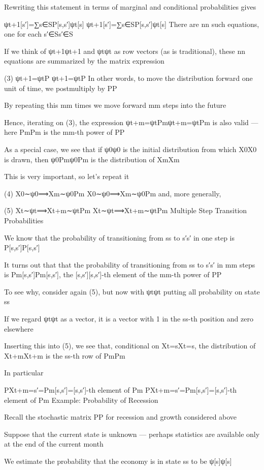 Rewriting this statement in terms of marginal and conditional probabilities gives

ψt+1[s′]=∑s∈SP[s,s′]ψt[s]
ψt+1[s′]=∑s∈SP[s,s′]ψt[s]
There are nn such equations, one for each s′∈Ss′∈S

If we think of ψt+1ψt+1 and ψtψt as row vectors (as is traditional), these nn equations are summarized by the matrix expression

(3)
ψt+1=ψtP
ψt+1=ψtP
In other words, to move the distribution forward one unit of time, we postmultiply by PP

By repeating this mm times we move forward mm steps into the future

Hence, iterating on (3), the expression ψt+m=ψtPmψt+m=ψtPm is also valid — here PmPm is the mm-th power of PP

As a special case, we see that if ψ0ψ0 is the initial distribution from which X0X0 is drawn, then ψ0Pmψ0Pm is the distribution of XmXm

This is very important, so let’s repeat it

(4)
X0∼ψ0⟹Xm∼ψ0Pm
X0∼ψ0⟹Xm∼ψ0Pm
and, more generally,

(5)
Xt∼ψt⟹Xt+m∼ψtPm
Xt∼ψt⟹Xt+m∼ψtPm
Multiple Step Transition Probabilities

We know that the probability of transitioning from ss to s′s′ in one step is P[s,s′]P[s,s′]

It turns out that that the probability of transitioning from ss to s′s′ in mm steps is Pm[s,s′]Pm[s,s′], the [s,s′][s,s′]-th element of the mm-th power of PP

To see why, consider again (5), but now with ψtψt putting all probability on state ss

If we regard ψtψt as a vector, it is a vector with 1 in the ss-th position and zero elsewhere

Inserting this into (5), we see that, conditional on Xt=sXt=s, the distribution of Xt+mXt+m is the ss-th row of PmPm

In particular

P{Xt+m=s′}=Pm[s,s′]=[s,s′]-th element of Pm
P{Xt+m=s′}=Pm[s,s′]=[s,s′]-th element of Pm
Example: Probability of Recession

Recall the stochastic matrix PP for recession and growth considered above

Suppose that the current state is unknown — perhaps statistics are available only at the end of the current month

We estimate the probability that the economy is in state ss to be ψ[s]ψ[s]

